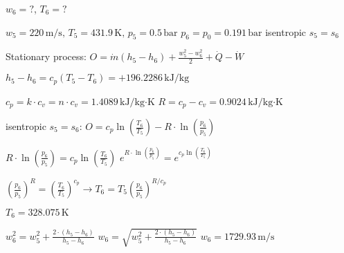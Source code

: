 \( w_6 = ? \), \( T_6 = ? \)  

\( w_5 = 220 \, \text{m/s}, \, T_5 = 431.9 \, \text{K}, \, p_5 = 0.5 \, \text{bar} \)  
\( p_6 = p_0 = 0.191 \, \text{bar} \)  
isentropic \( s_5 = s_6 \)  

Stationary process:  
\( O = \dot{m} \left( h_5 - h_6 \right) + \frac{w_5^2 - w_6^2}{2} + \dot{Q} - \dot{W} \)  

\( h_5 - h_6 = c_p \left( T_5 - T_6 \right) = + 196.2286 \, \text{kJ/kg} \)  

\( c_p = k \cdot c_v = n \cdot c_v = 1.4089 \, \text{kJ/kg·K} \)  
\( R = c_p - c_v = 0.9024 \, \text{kJ/kg·K} \)  

isentropic \( s_5 = s_6 \):  
\( O = c_p \ln \left( \frac{T_6}{T_5} \right) - R \cdot \ln \left( \frac{p_6}{p_5} \right) \)  

\( R \cdot \ln \left( \frac{p_6}{p_5} \right) = c_p \ln \left( \frac{T_6}{T_5} \right) \)  
\( e^{R \cdot \ln \left( \frac{p_6}{p_5} \right)} = e^{c_p \ln \left( \frac{T_6}{T_5} \right)} \)  

\( \left( \frac{p_6}{p_5} \right)^R = \left( \frac{T_6}{T_5} \right)^{c_p} \rightarrow T_6 = T_5 \left( \frac{p_6}{p_5} \right)^{R/c_p} \)  

\( T_6 = 328.075 \, \text{K} \)  

\( w_6^2 = w_5^2 + \frac{2 \cdot \left( h_5 - h_6 \right)}{h_5 - h_6} \)  
\( w_6 = \sqrt{w_5^2 + \frac{2 \cdot \left( h_5 - h_6 \right)}{h_5 - h_6}} \)  
\( w_6 = 1729.93 \, \text{m/s} \)